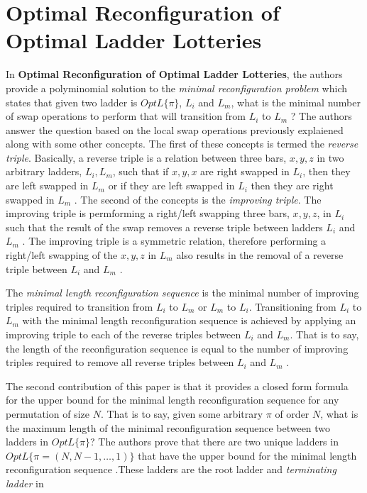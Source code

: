 \section{Optimal Reconfiguration of Optimal Ladder Lotteries}
In \textbf{Optimal Reconfiguration of Optimal Ladder Lotteries},
the authors provide a polyminomial solution to the 
\emph{minimal reconfiguration problem} which states that given 
two ladder is $OptL\{\pi\}$, $L_{i}$ and  $L_{m}$, what is the minimal number of 
swap operations to perform that will transition from $L_{i}$ to $L_{m}$ \cite{A2}?
The authors answer the question based on the local swap operations previously 
explaiened along with some other concepts. The first of these concepts 
is termed the \emph{reverse triple}. Basically, a reverse triple is a relation
between three bars, $x,y,z$ in two arbitrary ladders, $L_{i}, L_{m}$, such that if $x,y,x$
are right swapped in $L_{i}$, then they are left swapped in $L_{m}$ or if they are 
left swapped in $L_{i}$ then they are right swapped in $L_{m}$ \cite{A2}. 
The second of the concepts is the \emph{improving triple}. The improving triple is 
permforming a right/left swapping three bars, $x,y,z$, in $L_{i}$ such that the 
result of the swap removes a reverse triple between
ladders $L_{i}$ and $L_{m}$ \cite{A2}. The improving triple is a symmetric 
relation, therefore performing a right/left swapping of the $x,y,z$ in $L_{m}$ also results in the 
removal of a reverse triple between $L_{i}$ and $L_{m}$ \cite{A2}.\par
The \emph{minimal length reconfiguration sequence} is the minimal number of 
improving triples required to transition from $L_{i}$ to $L_{m}$ or 
$L_{m}$ to $L_{i}$. Transitioning from $L_{i}$ to $L_{m}$ with the minimal length reconfiguration sequence 
is achieved by applying an improving triple to each of the reverse triples between 
$L_{i}$ and $L_{m}$. That is to say, the length of the reconfiguration sequence 
is equal to the number of improving triples required to remove all reverse triples between $L_{i}$ and  $L_{m}$ \cite{A2}.\par
The second contribution of this paper is that it provides a closed form formula for the 
upper bound for the minimal length reconfiguration sequence for any permutation 
of size $N$. That is to say, given some arbitrary $\pi$ of order $N$, what is the maximum 
length of the minimal reconfiguration sequence between two ladders in $OptL\{\pi\}$?
The authors prove that there are two unique ladders in $OptL\{\pi=(N, N-1, \dots, 1)\}$ that 
have the upper bound for the minimal length reconfiguration sequence \cite{A2}.These ladders are the root ladder and \emph{terminating ladder} in 
